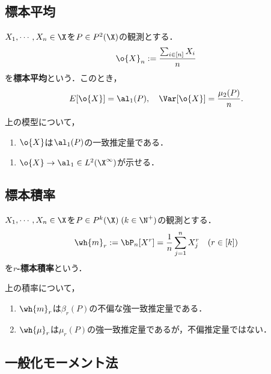 \documentclass[uplatex,dvipdfmx]{jsreport}
\begin{document}
\subsection{標本平均}

\begin{model}
    $X_1,\cdots,X_n\in\X$を$ P\in P^2(\X)$の観測とする．
    \[\o{X}_n:=\frac{\sum_{i\in[n]}X_i}{n}\]
    を\textbf{標本平均}という．このとき，
    \[E[\o{X}]=\al_1(P),\quad\Var[\o{X}]=\frac{\mu_2(P)}{n}.\]
\end{model}

\begin{proposition}
    上の模型について，
    \begin{enumerate}
        \item $\o{X}$は$\al_1(P)$の一致推定量である．
    \end{enumerate}
\end{proposition}
\begin{Proof}\mbox{}
    \begin{enumerate}
        \item $\o{X}\to\al_1\in L^2(\X^\infty)$が示せる．
    \end{enumerate}
\end{Proof}

\subsection{標本積率}

\begin{model}
    $X_1,\cdots,X_n\in\X$を$ P\in P^k(\X)\;(k\in\N^+)$の観測とする．
    \[\wh{m}_r:=\bP_n[X^r]=\frac{1}{n}\sum_{j=1}^nX^r_j\quad(r\in[k])\]
    を\textbf{$r$-標本積率}という．
\end{model}

\begin{proposition}
    上の積率について，
    \begin{enumerate}
        \item $\wh{m}_r$は$\beta_r(P)$の不偏な強一致推定量である．
        \item $\wh{\mu}_r$は$\mu_r(P)$の強一致推定量であるが，不偏推定量ではない．
    \end{enumerate}
\end{proposition}

\subsection{一般化モーメント法}
\end{document}
